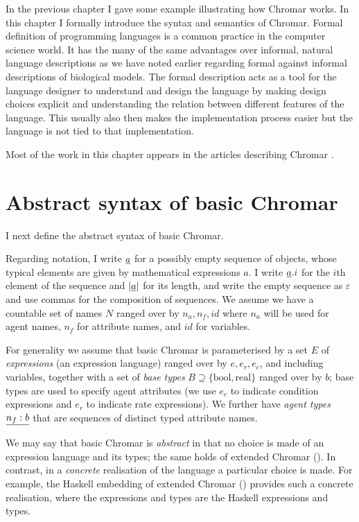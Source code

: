 In the previous chapter I gave some example illustrating how Chromar works. In
this chapter I formally introduce the syntax and semantics of Chromar. Formal
definition of programming languages is a common practice in the computer science
world. It has the many of the same advantages over informal, natural language
descriptions as we have noted earlier regarding formal against informal
descriptions of biological models. The formal description acts as a tool for the
language designer to understand and design the language by making design choices
explicit and understanding the relation between different features of the
language. This usually also then makes the implementation process easier but the
language is not tied to that implementation.

Most of the work in this chapter appears in the articles describing Chromar
\citep{honorato-zimmer_chromar_2017, honorato-zimmer_chromar_2018}.


\section{Abstract syntax of basic Chromar}
\label{sec:syntax}
I next define the abstract syntax of basic Chromar.

Regarding notation, I write $\underline{a}$ for a possibly empty sequence of objects,
whose typical elements are given by mathematical expressions $a$. I write
$\underline{a}.i$ for the $i$th element of the sequence and $|\underline{a}|$ for its length,
and write the empty sequence as $\varepsilon$ and use commas for the composition
of sequences.  We assume we have a countable set of names $N$ ranged over by
$n_a, n_f, id$ where $n_a$ will be used for agent names, $n_f$ for attribute
names, and $id$ for variables.

For generality we assume that basic Chromar is parameterised by a set $E$ of
\emph{expressions} (an expression language) ranged over by $e, e_r, e_c$, and
including variables, together with a set of \emph{base types}
$B \supseteq \{\mathrm{bool}, \mathrm{real} \}$ ranged over by $b$; base types are used to
specify agent attributes (we use $e_c$ to indicate condition expressions and
$e_r$ to indicate rate expressions).
%
We further have \emph{agent types} $\underline{n_f:b}$ that are sequences of distinct
typed attribute names.

We may say that basic Chromar is \emph{abstract} in that no choice is made of an
expression language and its types; the same holds of extended Chromar
().  In contrast, in a \emph{concrete} realisation of
the language a particular choice is made.  For example, the Haskell embedding of
extended Chromar () provides such a concrete realisation,
where the expressions and types are the Haskell expressions and types.

